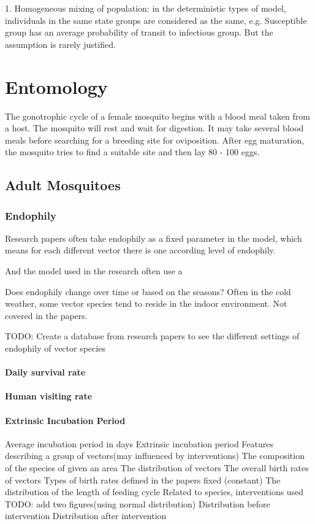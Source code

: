\documentclass[a4paper, 12pt, twoside]{article}
\begin{document}
1. Homogeneous mixing of population: in the deterministic types of model, individuals in the same state groups are considered as the same, e.g. Susceptible group has an average probability of transit to infectious group. But the assumption is rarely justified.



\section{Entomology}

The gonotrophic cycle of a female mosquito begins with a blood meal taken from a host. The mosquito will rest and wait for digestion. It may take several blood meals before searching for a breeding site for oviposition. After egg maturation, the mosquito tries to find a suitable site and then lay 80 - 100 eggs.

\subsection{Adult Mosquitoes}

\subsubsection{Endophily}
Research papers often take endophily as a fixed parameter in the model, which means for each different vector there is one according level of endophily.

And the model used in the research often use a 

Does endophily change over time or based on the seasons? Often in the cold weather, some vector species tend to reside in the indoor environment. Not covered in the papers.

TODO:
Create a database from research papers to see the different settings of endophily of vector species

\paragraph{Daily survival rate}

\paragraph{Human visiting rate}

\paragraph{Extrinsic Incubation Period}
Average incubation period in days
Extrinsic incubation period
Features describing a group of vectors(may influenced by interventions)
The composition of the species of given an area
The distribution of vectors
The overall birth rates of vectors
	Types of birth rates defined in the papers
fixed (constant)
The distribution of the length of feeding cycle
Related to species, interventions used
TODO: add two figures(using normal distribution)
Distribution before intervention
Distribution after intervention
\end{document}
